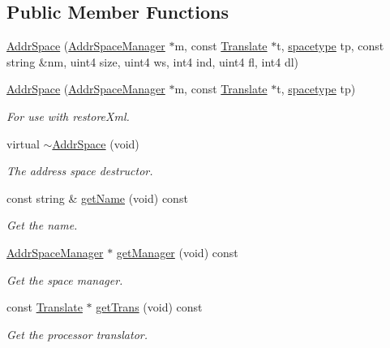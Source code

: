 \subsection*{Public Member Functions}
\begin{DoxyCompactItemize}
\item 
\mbox{\hyperlink{class_addr_space_a8ff2c48f386eb8be5d60206c28cc1be2}{Addr\+Space}} (\mbox{\hyperlink{class_addr_space_manager}{Addr\+Space\+Manager}} $\ast$m, const \mbox{\hyperlink{class_translate}{Translate}} $\ast$t, \mbox{\hyperlink{space_8hh_a1a83535cca68b7ca3f25bfad70262231}{spacetype}} tp, const string \&nm, uint4 size, uint4 ws, int4 ind, uint4 fl, int4 dl)
\item 
\mbox{\hyperlink{class_addr_space_a89ba3e0553cd1713a2becedf4541e6b9}{Addr\+Space}} (\mbox{\hyperlink{class_addr_space_manager}{Addr\+Space\+Manager}} $\ast$m, const \mbox{\hyperlink{class_translate}{Translate}} $\ast$t, \mbox{\hyperlink{space_8hh_a1a83535cca68b7ca3f25bfad70262231}{spacetype}} tp)
\begin{DoxyCompactList}\small\item\em For use with restore\+Xml. \end{DoxyCompactList}\item 
virtual \mbox{\hyperlink{class_addr_space_acb16b4237b6fdfd311f9fd6f96252613}{$\sim$\+Addr\+Space}} (void)
\begin{DoxyCompactList}\small\item\em The address space destructor. \end{DoxyCompactList}\item 
const string \& \mbox{\hyperlink{class_addr_space_a0ff86055617ff65ee8961b7c4e6caf98}{get\+Name}} (void) const
\begin{DoxyCompactList}\small\item\em Get the name. \end{DoxyCompactList}\item 
\mbox{\hyperlink{class_addr_space_manager}{Addr\+Space\+Manager}} $\ast$ \mbox{\hyperlink{class_addr_space_a1274986fce0448a40a055fb2bcd7aeb1}{get\+Manager}} (void) const
\begin{DoxyCompactList}\small\item\em Get the space manager. \end{DoxyCompactList}\item 
const \mbox{\hyperlink{class_translate}{Translate}} $\ast$ \mbox{\hyperlink{class_addr_space_a3a0cdcba6345332bd0f557a449de6948}{get\+Trans}} (void) const
\begin{DoxyCompactList}\small\item\em Get the processor translator. \end{DoxyCompactList}\item 

\end{DoxyCompactItemize}
